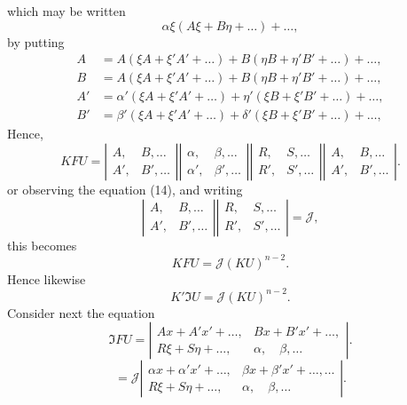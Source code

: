\documentclass[11pt,a4paper]{article}
\theoremstyle{plain}
\theoremstyle{definition}
\theoremstyle{remark}
\begin{document}
which may be written
\[
\alpha\xi(A\xi + B\eta + \ldots) + \ldots
\tag{16},
\]
\newpage
by putting
\begin{align*}
A &= A(\xi A + \xi' A' + \ldots) + B(\eta B + \eta' B' + \ldots) + \ldots, \\
B &= A(\xi A + \xi' A' + \ldots) + B(\eta B + \eta' B' + \ldots) + \ldots, \\
A' &= \alpha'(\xi A + \xi' A' + \ldots) + \eta'(\xi B + \xi' B' + \ldots) + \ldots, \\
B' &= \beta'(\xi A + \xi' A' + \ldots) + \delta'(\xi B + \xi' B' + \ldots) + \ldots,
\end{align*}
Hence,
\[
KFU = \left|\begin{array}{cc}
A, & B, \ldots \\
A', & B', \ldots
\end{array}\right|
\left|\begin{array}{cc}
\alpha, & \beta, \ldots \\
\alpha', & \beta', \ldots
\end{array}\right|
\left|\begin{array}{cc}
R, & S, \ldots \\
R', & S', \ldots
\end{array}\right|
\left|\begin{array}{cc}
A, & B, \ldots \\
A', & B', \ldots
\end{array}\right|
\tag{17}.
\]
or observing the equation (14), and writing
\[
\left|\begin{array}{cc}
A, & B, \ldots \\
A', & B', \ldots
\end{array}\right|
\left|\begin{array}{cc}
R, & S, \ldots \\
R', & S', \ldots
\end{array}\right| = \mathcal{J}
\tag{18},
\]
this becomes
\[
KFU = \mathcal{J}(KU)^{n-2}
\tag{19}.
\]
Hence likewise
\[
K'\mathfrak{I}U = \mathcal{J}(KU)^{n-2}
\tag{20}.
\]
Consider next the equation
\[
\mathfrak{I}FU =
\left|\begin{array}{cc}
Ax + A'x' + \ldots, & Bx + B'x' + \ldots, \\
R\xi + S\eta + \ldots, & \alpha, \quad \beta, \ldots
\end{array}\right|
\tag{21}.
\]
\[
= \mathcal{J}
\left|\begin{array}{cc}
\alpha x + \alpha'x' + \ldots, & \beta x + \beta'x' + \ldots, \ldots \\
R\xi + S\eta + \ldots, & \alpha, \quad \beta, \ldots
\end{array}\right|
\tag{22}.
\]
\end{document}
